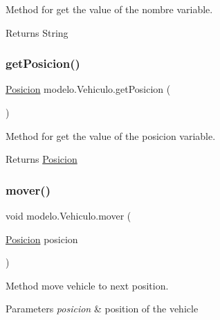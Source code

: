 Method for get the value of the nombre variable. 

\begin{DoxyReturn}{Returns}
String 
\end{DoxyReturn}
\mbox{\label{classmodelo_1_1_vehiculo_a6ac6859c6824cee3ce3c8c1838fd99bd}} 
\subsubsection{\texorpdfstring{get\+Posicion()}{getPosicion()}}
{\footnotesize\ttfamily \mbox{\hyperlink{classmodelo_1_1_posicion}{Posicion}} modelo.\+Vehiculo.\+get\+Posicion (\begin{DoxyParamCaption}{ }\end{DoxyParamCaption})}



Method for get the value of the posicion variable. 

\begin{DoxyReturn}{Returns}
\mbox{\hyperlink{classmodelo_1_1_posicion}{Posicion}} 
\end{DoxyReturn}
\mbox{\label{classmodelo_1_1_vehiculo_a253de2462a326996b4f427bf204ae1f9}} 
\subsubsection{\texorpdfstring{mover()}{mover()}}
{\footnotesize\ttfamily void modelo.\+Vehiculo.\+mover (\begin{DoxyParamCaption}\item[{\mbox{\hyperlink{classmodelo_1_1_posicion}{Posicion}}}]{posicion }\end{DoxyParamCaption})}



Method move vehicle to next position. 


\begin{DoxyParams}{Parameters}
{\em posicion} & position of the vehicle \\
\hline
\end{DoxyParams}
\mbox{\label{classmodelo_1_1_vehiculo_af8ba11f972f7cafec1e4f2379072c297}} 
